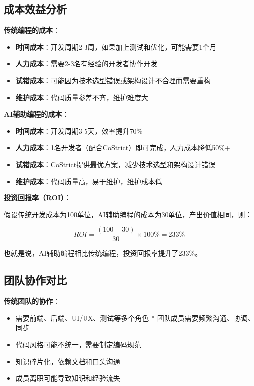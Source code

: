 ﻿\documentclass[12pt,a4paper]{article}
\begin{document}
\subsection{成本效益分析}

\textbf{传统编程的成本}：

\begin{itemize}
    \item \textbf{时间成本}：开发周期2-3周，如果加上测试和优化，可能需要1个月
    \item \textbf{人力成本}：需要2-3名有经验的开发者协作开发
    \item \textbf{试错成本}：可能因为技术选型错误或架构设计不合理而需要重构
    \item \textbf{维护成本}：代码质量参差不齐，维护难度大
\end{itemize}

\textbf{AI辅助编程的成本}：

\begin{itemize}
    \item \textbf{时间成本}：开发周期3-5天，效率提升70\%+
    \item \textbf{人力成本}：1名开发者（配合CoStrict）即可完成，人力成本降低50\%+
    \item \textbf{试错成本}：CoStrict提供最优方案，减少技术选型和架构设计错误
    \item \textbf{维护成本}：代码质量高，易于维护，维护成本低
\end{itemize}

\textbf{投资回报率（ROI）}：

假设传统开发成本为100单位，AI辅助编程的成本为30单位，产出价值相同，则：

\[
ROI = \frac{(100 - 30)}{30} \times 100\% = 233\%
\]

也就是说，AI辅助编程相比传统编程，投资回报率提升了233\%。

\subsection{团队协作对比}

\textbf{传统团队的协作}：

\begin{itemize}
    \item 需要前端、后端、UI/UX、测试等多个角色
    * 团队成员需要频繁沟通、协调、同步
    \item 代码风格可能不统一，需要制定编码规范
    \item 知识碎片化，依赖文档和口头沟通
    \item 成员离职可能导致知识和经验流失
\end{itemize}
\end{document}
